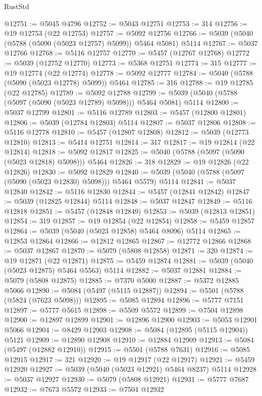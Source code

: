\begin{lexlean}{RustStd}
\begin{coremodule}
@12751 := @5045 @4796
@12752 := @5043 @12751
@12753 := 314
@12756 := @19 @12753 (@22 @12753)
@12757 := @5092 @12756
@12766 := @5039 (@5040 (@5788 (@5090 (@5023 @12757) @5099)) @5464 @5081) @5114
@12767 := @5037 @12766
@12768 := @5116 @12757
@12770 := @5457 (@12767 @12768)
@12772 := @5039 (@12752 @12770)
@12773 := @5368 @12751
@12774 := 315
@12777 := @19 @12774 (@22 @12774)
@12778 := @5092 @12777
@12784 := @5040 (@5788 (@5090 (@5023 @12778) @5099)) @5464
@12785 := 316
@12788 := @19 @12785 (@22 @12785)
@12789 := @5092 @12788
@12799 := @5039 (@5040 (@5788 (@5097 (@5090 (@5023 @12789) @5098))) @5464 @5081) @5114
@12800 := @5037 @12799
@12801 := @5116 @12789
@12803 := @5457 (@12800 @12801)
@12806 := @5039 (@12784 @12803) @5114
@12807 := @5037 @12806
@12808 := @5116 @12778
@12810 := @5457 (@12807 @12808)
@12812 := @5039 (@12773 @12810)
@12813 := @5414 @12751
@12814 := 317
@12817 := @19 @12814 (@22 @12814)
@12818 := @5092 @12817
@12825 := @5040 (@5788 (@5097 (@5090 (@5023 @12818) @5098))) @5464
@12826 := 318
@12829 := @19 @12826 (@22 @12826)
@12830 := @5092 @12829
@12840 := @5039 (@5040 (@5788 (@5097 (@5090 (@5023 @12830) @5098))) @5464 @5579) @5114
@12841 := @5037 @12840
@12842 := @5116 @12830
@12844 := @5457 (@12841 @12842)
@12847 := @5039 (@12825 @12844) @5114
@12848 := @5037 @12847
@12849 := @5116 @12818
@12851 := @5457 (@12848 @12849)
@12853 := @5039 (@12813 @12851)
@12854 := 319
@12857 := @19 @12854 (@22 @12854)
@12858 := @5459 @12857
@12864 := @5039 (@5040 (@5023 @12858) @5464 @8096) @5114
@12865 := @12853 @12864
@12866 := @12812 @12865
@12867 := @12772 @12866
@12868 := @5037 @12867
@12870 := @5079 (@5808 @12858)
@12871 := 320
@12874 := @19 @12871 (@22 @12871)
@12875 := @5459 @12874
@12881 := @5039 (@5040 (@5023 @12875) @5464 @5563) @5114
@12882 := @5037 @12881
@12884 := @5079 (@5808 @12875)
@12885 := @7370 @5000
@12887 := @5372 @12885 @5066
@12890 := @5084 (@5497 (@5115 @12887))
@12894 := @5501 (@5788 (@5824 (@7623 @5098)))
@12895 := @5085 @12894
@12896 := @5777 @7151
@12897 := @5777 @5615
@12898 := @5509 @5572
@12899 := @7504 @12898
@12900 := @12897 @12899
@12901 := @12896 @12900
@12903 := @5053 @12901 @5066
@12904 := @8429 @12903
@12908 := @5084 (@12895 (@5115 @12904)) @5121
@12909 := @12890 @12908
@12910 := @12884 @12909
@12913 := @5084 (@5497 (@12882 @12910))
@12915 := @5501 (@5788 @7631)
@12916 := @5085 @12915
@12917 := 321
@12920 := @19 @12917 (@22 @12917)
@12921 := @5459 @12920
@12927 := @5039 (@5040 (@5023 @12921) @5464 @8237) @5114
@12928 := @5037 @12927
@12930 := @5079 (@5808 @12921)
@12931 := @5777 @7687
@12932 := @7673 @5572
@12933 := @7504 @12932

\end{coremodule}
\end{lexlean}
